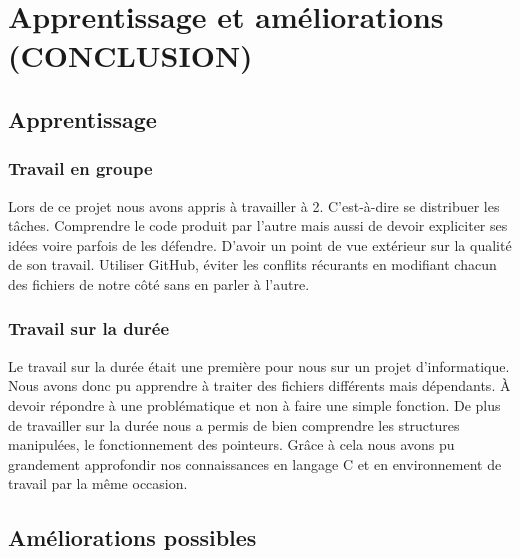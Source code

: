 \documentclass{article}
\begin{document}
\newpage

\section{Apprentissage et améliorations (CONCLUSION)}

\vspace{1em}

\subsection{Apprentissage}

\vspace{1em}
\subsubsection{Travail en groupe}

\hspace{1em} Lors de ce projet nous avons appris à travailler à 2. C'est-à-dire se distribuer les tâches. Comprendre le code produit par l'autre mais aussi de devoir expliciter ses idées voire parfois de les défendre. D'avoir un point de vue extérieur sur la qualité de son travail. Utiliser GitHub, éviter les conflits récurants en modifiant chacun des fichiers de notre côté sans en parler à l'autre. 

\subsubsection{Travail sur la durée}

\hspace{1em} Le travail sur la durée était une première pour nous sur un projet d'informatique. Nous avons donc pu apprendre à traiter des fichiers différents mais dépendants. À devoir répondre à une problématique et non à faire une simple fonction. De plus de travailler sur la durée nous a permis de bien comprendre les structures manipulées, le fonctionnement des pointeurs. Grâce à cela nous avons pu grandement approfondir nos connaissances en langage C et en environnement de travail par la même occasion.  

\subsection{Améliorations possibles}
\end{document}

